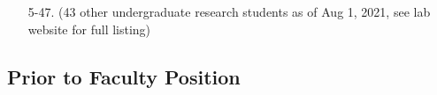 \documentclass[10pt,letterpaper]{article}
\renewenvironment{itemize}{
  \begin{list}{}{
    \setlength{\leftmargin}{1.25em}
    \setlength{\itemsep}{0.25em}
    \setlength{\parskip}{0pt}
    \setlength{\parsep}{0.2em}
  }
}{
  \end{list}
}
\begin{document}
\begin{itemize}
\begin{enumerate}
    \item[5-47.] (43 other undergraduate research students as of Aug 1, 2021, see lab website for full listing) 
  \end{enumerate}
\end{itemize}

\subsection*{Prior to Faculty Position}
\end{document}

